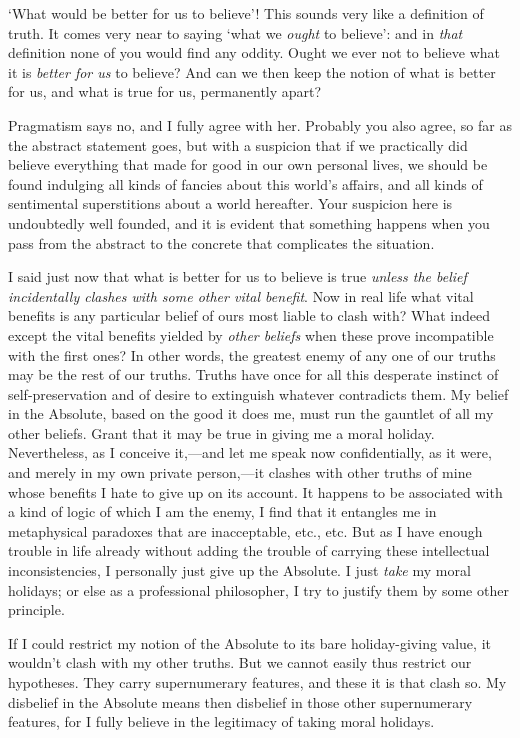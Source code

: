 `What would be better for us to believe'! This sounds very
like a definition of truth. It comes very near to saying `what we
\textit{ought} to believe': and in \textit{that} definition none of
you would find any oddity. Ought we ever not to believe what it is
\textit{better for us} to believe? And can we then keep the notion of
what is better for us, and what is true for us, permanently apart?

Pragmatism says no, and I fully agree with her. Probably you also
agree, so far as the abstract statement goes, but with a suspicion
that if we practically did believe everything that made for good in
our own personal lives, we should be found indulging all kinds of
fancies about this world's affairs, and all kinds of sentimental
superstitions about a world hereafter. Your suspicion here is
undoubtedly well founded, and it is evident that something happens
when you pass from the abstract to the concrete that complicates the
situation.

I said just now that what is better for us to believe is true
\textit{unless the belief incidentally clashes with some other vital
benefit}. Now in  real life what vital benefits is any
particular belief of ours most liable to clash with? What indeed
except the vital benefits yielded by \textit{other beliefs} when these
prove incompatible with the first ones? In other words, the greatest
enemy of any one of our truths may be the rest of our truths. Truths
have once for all this desperate instinct of self-preservation and of
desire to extinguish whatever contradicts them. My belief in the
Absolute, based on the good it does me, must run the gauntlet of all
my other beliefs. Grant that it may be true in giving me a moral
holiday. Nevertheless, as I conceive it,---and let me speak now
confidentially, as it were, and merely in my own private person,---it
clashes with other truths of mine whose benefits I hate to give up on
its account. It happens to be associated with a kind of logic of
which I am the enemy, I find that it entangles me in metaphysical
paradoxes that are inacceptable, etc., etc. But as I have enough
trouble in life already without adding the trouble of carrying these
intellectual inconsistencies, I personally just give up the 
Absolute. I just \textit{take} my moral holidays; or else as a
professional philosopher, I try to justify them by some other
principle.

If I could restrict my notion of the Absolute to its bare
holiday-giving value, it wouldn't clash with my other truths. But we
cannot easily thus restrict our hypotheses. They carry supernumerary
features, and these it is that clash so. My disbelief in the Absolute
means then disbelief in those other supernumerary features, for I
fully believe in the legitimacy of taking moral holidays.

